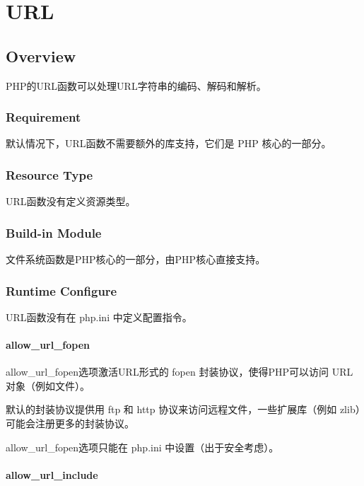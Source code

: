 \part{URL}


\chapter{Overview}


PHP的URL函数可以处理URL字符串的编码、解码和解析。


\section{Requirement}

默认情况下，URL函数不需要额外的库支持，它们是 PHP 核心的一部分。

\section{Resource Type}

URL函数没有定义资源类型。


\section{Build-in Module}

文件系统函数是PHP核心的一部分，由PHP核心直接支持。

\section{Runtime Configure}

URL函数没有在 php.ini 中定义配置指令。




\subsection{allow\_url\_fopen}


allow\_url\_fopen选项激活URL形式的 fopen 封装协议，使得PHP可以访问 URL 对象（例如文件）。

默认的封装协议提供用 ftp 和 http 协议来访问远程文件，一些扩展库（例如 zlib）可能会注册更多的封装协议。

allow\_url\_fopen选项只能在 php.ini 中设置（出于安全考虑）。

\subsection{allow\_url\_include}

